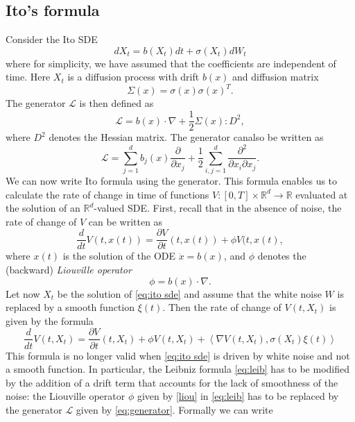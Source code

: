 \documentclass{article}
\begin{document}
\subsection*{Ito's formula}
Consider the Ito SDE
\begin{equation}
    dX_t=b(X_t)dt+\sigma(X_t)dW_t \label{eq:ito sde}
\end{equation}
where for simplicity, we have assumed that the coefficients are independent of time. Here $X_t$ is a diffusion process with drift $b(x)$ and diffusion matrix
$$\Sigma(x)=\sigma(x)\sigma(x)^T.$$
The generator $\mathcal{L}$ is then defined as 
\begin{equation}
    \mathcal{L} = b(x)\cdot \nabla +\frac{1}{2}\Sigma(x):D^2,
    \label{eq:generator}
\end{equation}
where $D^2$ denotes the Hessian matrix. The generator canalso be written as
\begin{equation}
    \mathcal{L} = \sum_{j=1}^{d} b_j(x)\frac{\partial}{\partial x_j} +\frac{1}{2}\sum_{i,j=1}^d \frac{\partial^2}{\partial x_i \partial x_j}.
\end{equation}
We can now write Ito formula using the generator. This formula enables us to calculate the rate of change in time of functions $V: [0,T] \times \mathbb{R}^d\to \mathbb{R}$ evaluated at the solution of an $\mathbb{R}^d$-valued SDE. First, recall that in the absence of noise, the rate of change of $V$ can be written as 
\begin{equation}
    \frac{d}{dt}V(t,x(t))=\frac{\partial V}{\partial t}(t,x(t))+\phi V(t,x(t),
\end{equation}
where $x(t)$ is the solution of the ODE $\dot{x} = b(x)$, and $\phi$ denotes the (backward) \textit{Liouville operator} 
\begin{equation}
    \phi = b(x) \cdot \nabla.
    \label{liou}
\end{equation}
Let now $X_t$ be the solution of \eqref{eq:ito sde} and assume that the white noise $W$ is replaced by a smooth function $\xi(t)$. Then the rate of change of $V(t,X_t)$ is given by the formula
\begin{equation}
    \frac{d}{dt}V(t,X_t) = \frac{\partial V}{\partial t}(t,X_t)+\phi V(t,X_t)+ \left< \nabla V(t,X_t), \sigma (X_t) \xi(t) \right>
    \label{eq:leib}
\end{equation}
This formula is no longer valid when \eqref{eq:ito sde} is driven by white noise and not a smooth function. In particular, the Leibniz formula \eqref{eq:leib} has to be modified by the addition of a drift term that accounts for the lack of smoothness of the noise: the Liouville operator $\phi$ given by \eqref{liou} in \eqref{eq:leib} has to be replaced by the generator $\mathcal{L}$ given by \eqref{eq:generator}. Formally we can write
\end{document}

